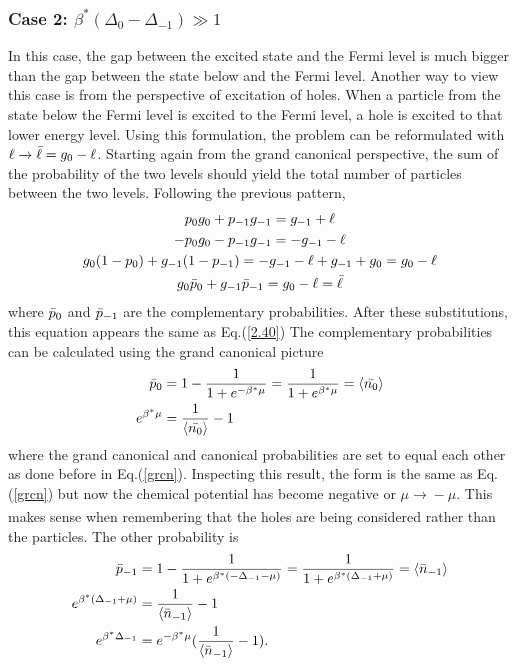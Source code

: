 \subsubsection{Case 2: $\beta^*(\Delta_0-\Delta_{-1})\gg 1$}
In this case, the gap between the excited state and the Fermi level is much bigger
than the gap between the state below and the Fermi level. Another way to view this case is from the perspective of excitation of holes. When a particle from the state below the Fermi level is excited to the Fermi level, a hole is excited to that lower energy level. Using this formulation, the problem can be reformulated with $\ell \xrightarrow[]{} \Bar{\ell}=g_0-\ell$. Starting again from the grand canonical perspective, the sum of the probability of the two levels should yield the total number of particles between the two levels. Following the previous pattern,
\begin{gather}
    p_0g_0+p_{-1}g_{-1}=g_{-1}+\ell\nonumber\\
    -p_0g_0-p_{-1}g_{-1}=-g_{-1}-\ell\nonumber\\
    g_0(1-p_0)+g_{-1}(1-p_{-1})=-g_{-1}-\ell+g_{-1}+g_0=g_0-\ell\nonumber\\
    g_0\Bar{p}_0+g_{-1}\Bar{p}_{-1}=g_0-\ell=\Bar{\ell}
\end{gather}
where $\Bar{p}_0$ and $\Bar{p}_{-1}$ are the complementary probabilities. After these substitutions, this equation appears the same as Eq.\@ (\ref{2.40}) The complementary probabilities can be calculated using the grand canonical picture 
\begin{align}
    \Bar{p}_0&=1-\frac{1}{1+e^{-\beta^*\mu}}=\frac{1}{1+e^{\beta^*\mu}}=\left<{\Bar{n_0}}\right>\\
    e^{\beta^*\mu}&=\frac{1}{\left<{\Bar{n_0}}\right>}-1 \label{2.47}
\end{align}
where the grand canonical and canonical probabilities are set to equal each other as done before in Eq.\@ (\ref{grcn}). Inspecting this result, the form is the same as Eq.\@ (\ref{grcn}) but now the chemical potential has become negative or $\mu\xrightarrow[]{}-\mu$. This makes sense when remembering that the holes are being considered rather than the particles. The other probability is 
\begin{align}
    \Bar{p}_{-1}&=1-\frac{1}{1+e^{\beta^*(-\Delta_{-1}-\mu)}}=\frac{1}{1+e^{\beta^*(\Delta_{-1}+\mu)}}=\left<{\Bar{n}_{-1}}\right>\\
    e^{\beta^*(\Delta_{-1}+\mu)}&=\frac{1}{\left<{\Bar{n}_{-1}}\right>}-1\nonumber\\
    e^{\beta^*\Delta_{-1}}&=e^{-\beta^*\mu}(\frac{1}{\left<{\Bar{n}_{-1}}\right>}-1). \label{2.49}
\end{align}
